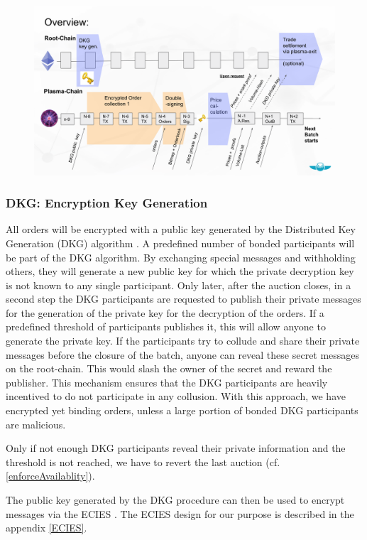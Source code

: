 \documentclass[11pt,parskip=full]{scrartcl}%
\begin{document}
\begin{figure}
\centering
\includegraphics[width=\textwidth]{overview_tradeflow.png}
\end{figure}



\subsubsection{DKG: Encryption Key Generation}
All orders will be encrypted with a public key generated by the Distributed Key Generation (DKG) algorithm \cite{DKG}. 
A predefined number of bonded participants will be part of the DKG algorithm. 
By exchanging special messages and withholding others, they will generate a new public key for which the private decryption key is not known to any single participant. 
Only later, after the auction closes, in a second step the DKG participants are requested to publish their private messages for the generation of the private key for the decryption of the orders.
If a predefined threshold of participants publishes it, this will allow anyone to generate the private key. 
If the participants try to collude and share their private messages before the closure of the batch, anyone can reveal these secret messages on the root-chain. This would slash the owner of the secret and reward the publisher. This mechanism ensures that the DKG participants are heavily incentived to do not participate in any collusion. 
With this approach, we have encrypted yet binding orders, unless a large portion of bonded DKG participants are malicious. 

Only if not enough DKG participants reveal their private information and the threshold is not reached, we have to revert the last auction (cf. \ref{enforceAvailablity}).


The public key generated by the DKG procedure can then be used to encrypt messages via the ECIES \cite{ECIES}. 
The ECIES design for our purpose is described in the appendix \ref{ECIES}.
\end{document}

